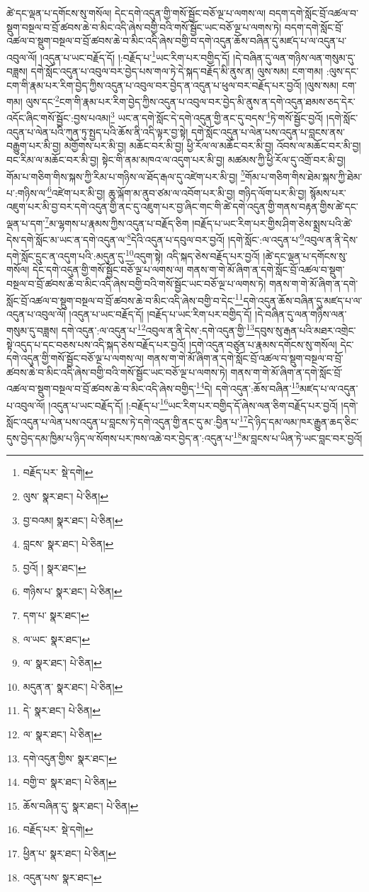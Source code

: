 ཚེ་དང་ལྡན་པ་དགོངས་སུ་གསོལ། དེང་དགེ་འདུན་གྱི་གསོ་སྦྱོང་བཅོ་ལྔ་པ་ལགས་ལ། བདག་དགེ་སློང་བྲོ་འཚལ་བ་སྡུག་བསྔལ་བ་བྲོ་ཚབས་ཆེ་བ་མིང་འདི་ཞེས་བགྱི་བའི་གསོ་སྦྱོང་ཡང་བཅོ་ལྔ་པ་ལགས་ཏེ། བདག་དགེ་སློང་བྲོ་འཚལ་བ་སྡུག་བསྔལ་བ་བྲོ་ཚབས་ཆེ་བ་མིང་འདི་ཞེས་བགྱི་བ་དགེ་འདུན་ཆོས་བཞིན་དུ་མཛད་པ་ལ་འདུན་པ་འབུལ་ལོ། །འདུན་པ་ཡང་བརྗོད་དོ། །:བརྗོད་པ་\footnote{བརྗོད་པར་  སྡེ་དགེ། }ཡང་རིག་པར་བགྱིད་དོ། །དེ་བཞིན་དུ་ལན་གཉིས་ལན་གསུམ་དུ་བཟླས། དགེ་སློང་འདུན་པ་འབུལ་བར་བྱེད་པས་གལ་ཏེ་དེ་སྐད་བརྗོད་མི་ནུས་ན། ལུས་སམ། ངག་གམ། :ལུས་དང་ངག་གི་རྣམ་པར་རིག་བྱེད་ཀྱིས་འདུན་པ་འབུལ་བར་བྱེད་ན་འདུན་པ་ཕུལ་བར་བརྗོད་པར་བྱའོ། །ལུས་སམ། ངག་གམ། ལུས་དང་\footnote{ལུས་  སྣར་ཐང་།  པེ་ཅིན། }ངག་གི་རྣམ་པར་རིག་བྱེད་ཀྱིས་འདུན་པ་འབུལ་བར་བྱེད་མི་ནུས་ན་དགེ་འདུན་ཐམས་ཅད་དེར་འདོང་ཞིང་གསོ་སྦྱོང་:བྱས་པའམ།\footnote{བྱ་བའམ།  སྣར་ཐང་།  པེ་ཅིན། } ཡང་ན་དགེ་སློང་དེ་དགེ་འདུན་གྱི་ནང་དུ་བདས་\footnote{བླངས་  སྣར་ཐང་།  པེ་ཅིན། }ཏེ་གསོ་སྦྱོང་བྱའོ། །དགེ་སློང་འདུན་པ་ལེན་པའི་ཀུན་ཏུ་སྤྱད་པའི་ཆོས་ནི་འདི་ལྟར་བྱ་སྟེ། དགེ་སློང་འདུན་པ་ལེན་པས་འདུན་པ་བླངས་ནས་བརྒྱུག་པར་མི་བྱ། མགྱོགས་པར་མི་བྱ། མཆོང་བར་མི་བྱ། ཕྱི་རོལ་ལ་མཆོང་བར་མི་བྱ། འོབས་ལ་མཆོང་བར་མི་བྱ། བང་རིམ་ལ་མཆོང་བར་མི་བྱ། སྟེང་གི་ནམ་མཁའ་ལ་འདུག་པར་མི་བྱ། མཚམས་ཀྱི་ཕྱི་རོལ་དུ་འགྲོ་བར་མི་བྱ། གོམ་པ་གཅིག་གིས་སྐས་ཀྱི་རིམ་པ་གཉིས་ལ་ཐོད་རྒལ་དུ་འཛེག་པར་མི་བྱ། \footnote{བྱའོ། །   སྣར་ཐང་། }གོམ་པ་གཅིག་གིས་ཐེམ་སྐས་ཀྱི་ཐེམ་པ་:གཉིས་ལ་\footnote{གཉིས་པ་  སྣར་ཐང་།  པེ་ཅིན། }འཛེག་པར་མི་བྱ། ཆུ་ལྐོག་མ་ནུབ་ཙམ་ལ་འབོག་པར་མི་བྱ། གཉིད་ལོག་པར་མི་བྱ། སྙོམས་པར་འཇུག་པར་མི་བྱ་བར་དགེ་འདུན་གྱི་ནང་དུ་འཇུག་པར་བྱ་ཞིང་གང་གི་ཚེ་དགེ་འདུན་གྱི་གནས་བརྟན་གྱིས་ཚེ་དང་ལྡན་པ་དག་\footnote{དག་པ་  སྣར་ཐང་། }མ་ལྷགས་པ་རྣམས་ཀྱིས་འདུན་པ་བརྗོད་ཅིག །བརྗོད་པ་ཡང་རིག་པར་གྱིས་ཤིག་ཅེས་སྨྲས་པའི་ཚེ་དེས་དགེ་སློང་མ་ཡང་ན་དགེ་འདུན་ལ་\footnote{ལ་ཡང་  སྣར་ཐང་། }དེའི་འདུན་པ་དབུལ་བར་བྱའོ། །དགེ་སློང་:ལ་འདུན་པ་\footnote{ལ་  སྣར་ཐང་།  པེ་ཅིན། }འབུལ་ན་ནི་དེས་དགེ་སློང་དྲུང་ན་འདུག་པའི་:མདུན་དུ་\footnote{མདུན་ན་  སྣར་ཐང་།  པེ་ཅིན། }འདུག་སྟེ། འདི་སྐད་ཅེས་བརྗོད་པར་བྱའོ། །ཚེ་དང་ལྡན་པ་དགོངས་སུ་གསོལ། དེང་དགེ་འདུན་གྱི་གསོ་སྦྱོང་བཅོ་ལྔ་པ་ལགས་ལ། གནས་ག་གེ་མོ་ཞིག་ན་དགེ་སློང་བྲོ་འཚལ་བ་སྡུག་བསྔལ་བ་བྲོ་ཚབས་ཆེ་བ་མིང་འདི་ཞེས་བགྱི་བའི་གསོ་སྦྱོང་ཡང་བཅོ་ལྔ་པ་ལགས་ཏེ། གནས་ག་གེ་མོ་ཞིག་ན་དགེ་སློང་བྲོ་འཚལ་བ་སྡུག་བསྔལ་བ་བྲོ་ཚབས་ཆེ་བ་མིང་འདི་ཞེས་བགྱི་བ་དེང་\footnote{དེ་  སྣར་ཐང་།  པེ་ཅིན། }དགེ་འདུན་ཆོས་བཞིན་དུ་མཛད་པ་ལ་འདུན་པ་འབུལ་ལོ། །འདུན་པ་ཡང་བརྗོད་དོ། །བརྗོད་པ་ཡང་རིག་པར་བགྱིད་དོ། །དེ་བཞིན་དུ་ལན་གཉིས་ལན་གསུམ་དུ་བཟླས། དགེ་འདུན་:ལ་འདུན་པ་\footnote{ལ་  སྣར་ཐང་།  པེ་ཅིན། }འབུལ་ན་ནི་དེས་:དགེ་འདུན་གྱི་\footnote{དགེ་འདུན་གྱིས་  སྣར་ཐང་། }དབུས་སུ་རྒན་པའི་མཐར་འགྲེང་སྟེ་འདུད་པ་དང་བཅས་པས་འདི་སྐད་ཅེས་བརྗོད་པར་བྱའོ། །དགེ་འདུན་བཙུན་པ་རྣམས་དགོངས་སུ་གསོལ། དེང་དགེ་འདུན་གྱི་གསོ་སྦྱོང་བཅོ་ལྔ་པ་ལགས་ལ། གནས་ག་གེ་མོ་ཞིག་ན་དགེ་སློང་བྲོ་འཚལ་བ་སྡུག་བསྔལ་བ་བྲོ་ཚབས་ཆེ་བ་མིང་འདི་ཞེས་བགྱི་བའི་གསོ་སྦྱོང་ཡང་བཅོ་ལྔ་པ་ལགས་ཏེ། གནས་ག་གེ་མོ་ཞིག་ན་དགེ་སློང་བྲོ་འཚལ་བ་སྡུག་བསྔལ་བ་བྲོ་ཚབས་ཆེ་བ་མིང་འདི་ཞེས་བགྱིད་\footnote{བགྱི་བ་  སྣར་ཐང་།  པེ་ཅིན། }དེ། དགེ་འདུན་:ཆོས་བཞིན་\footnote{ཆོས་བཞིན་དུ་  སྣར་ཐང་།  པེ་ཅིན། }མཛད་པ་ལ་འདུན་པ་འབུལ་ལོ། །འདུན་པ་ཡང་བརྗོད་དོ། །:བརྗོད་པ་\footnote{བརྗོད་པར་  སྡེ་དགེ། }ཡང་རིག་པར་བགྱིད་དོ་ཞེས་ལན་ཅིག་བརྗོད་པར་བྱའོ། །དགེ་སློང་འདུན་པ་ལེན་པས་འདུན་པ་བླངས་ཏེ་དགེ་འདུན་གྱི་ནང་དུ་མ་:བྱིན་པ་\footnote{ཕྱིན་པ་  སྣར་ཐང་།  པེ་ཅིན། }དེ་ཉིད་དམ་ལམ་ཁར་རྒྱུན་ཆད་ཅིང་དུས་བྱེད་དམ་ཁྱིམ་པ་ཉིད་ལ་སོགས་པར་ཁས་འཆེ་བར་བྱེད་ན་:འདུན་པ་\footnote{འདུན་པས་  སྣར་ཐང་། }མ་བླངས་པ་ཡིན་ཏེ་ཡང་བླང་བར་བྱའོ། 